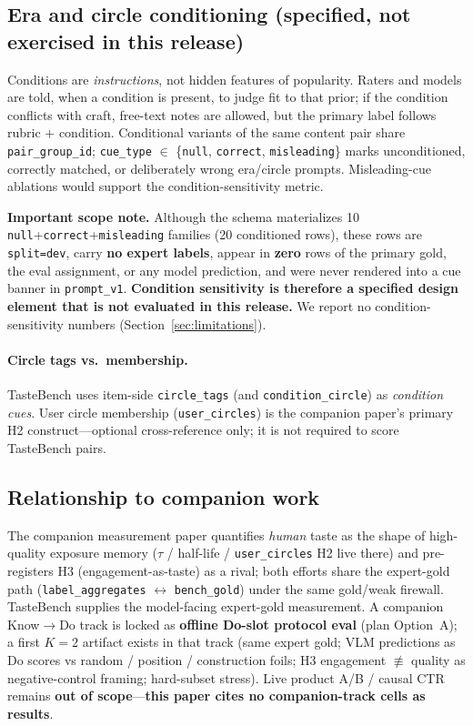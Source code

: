 \documentclass[11pt,a4paper]{article}
\begin{document}
\subsection{Era and circle conditioning (specified, not exercised in this release)}
\label{sec:conditioning}

Conditions are \emph{instructions}, not hidden features of popularity. Raters and models are told, when a condition is present, to judge fit to that prior; if the condition conflicts with craft, free-text notes are allowed, but the primary label follows rubric $+$ condition. Conditional variants of the same content pair share \texttt{pair\_group\_id}; \texttt{cue\_type} $\in$ \{\texttt{null}, \texttt{correct}, \texttt{misleading}\} marks unconditioned, correctly matched, or deliberately wrong era/circle prompts. Misleading-cue ablations would support the condition-sensitivity metric.

\textbf{Important scope note.} Although the schema materializes 10 \texttt{null}+\texttt{correct}+\texttt{misleading} families (20 conditioned rows), these rows are \texttt{split=dev}, carry \textbf{no expert labels}, appear in \textbf{zero} rows of the primary gold, the eval assignment, or any model prediction, and were never rendered into a cue banner in \texttt{prompt\_v1}. \textbf{Condition sensitivity is therefore a specified design element that is not evaluated in this release.} We report no condition-sensitivity numbers (Section~\ref{sec:limitations}).

\paragraph{Circle tags vs.\ membership.} TasteBench uses item-side \texttt{circle\_tags} (and \texttt{condition\_circle}) as \emph{condition cues}. User circle membership (\texttt{user\_circles}) is the companion paper's primary H2 construct---optional cross-reference only; it is not required to score TasteBench pairs.

\subsection{Relationship to companion work}

The companion measurement paper quantifies \emph{human} taste as the shape of high-quality exposure memory ($\tau$ / half-life / \texttt{user\_circles} H2 live there) and pre-registers H3 (engagement-as-taste) as a rival; both efforts share the expert-gold path (\texttt{label\_aggregates} $\leftrightarrow$ \texttt{bench\_gold}) under the same gold/weak firewall. TasteBench supplies the model-facing expert-gold measurement. A companion Know$\rightarrow$Do track is locked as \textbf{offline Do-slot protocol eval} (plan Option~A); a first $K{=}2$ artifact exists in that track (same expert gold; VLM predictions as Do scores vs random / position / construction foils; H3 engagement $\not\equiv$ quality as negative-control framing; hard-subset stress). Live product A/B / causal CTR remains \textbf{out of scope}---\textbf{this paper cites no companion-track cells as results}.
\end{document}
